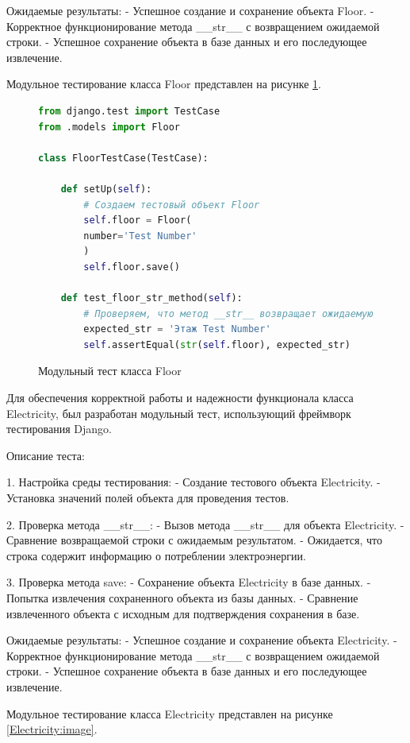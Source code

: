 Ожидаемые результаты:
- Успешное создание и сохранение объекта Floor.
- Корректное функционирование метода \_\_str\_\_ с возвращением ожидаемой строки.
- Успешное сохранение объекта в базе данных и его последующее извлечение.

Модульное тестирование класса Floor представлен на рисунке \ref{Floor:image}.


\begin{figure}[ht]
\begin{lstlisting}[language=Python]
from django.test import TestCase
from .models import Floor

class FloorTestCase(TestCase):

	def setUp(self):
		# Создаем тестовый объект Floor
		self.floor = Floor(
		number='Test Number'
		)
		self.floor.save()
	
	def test_floor_str_method(self):
		# Проверяем, что метод __str__ возвращает ожидаемую строку
		expected_str = 'Этаж Test Number'
		self.assertEqual(str(self.floor), expected_str)


\end{lstlisting}  
\caption{Модульный тест класса Floor}
\label{Floor:image}
\end{figure}

\newpage

Для обеспечения корректной работы и надежности функционала класса Electricity, был разработан модульный тест, использующий фреймворк тестирования Django.

Описание теста:

1. Настройка среды тестирования:
- Создание тестового объекта Electricity.
- Установка значений полей объекта для проведения тестов.

2. Проверка метода \_\_str\_\_:
- Вызов метода \_\_str\_\_ для объекта Electricity.
- Сравнение возвращаемой строки с ожидаемым результатом.
- Ожидается, что строка содержит информацию о потреблении электроэнергии.

3. Проверка метода save:
- Сохранение объекта Electricity в базе данных.
- Попытка извлечения сохраненного объекта из базы данных.
- Сравнение извлеченного объекта с исходным для подтверждения сохранения в базе.

Ожидаемые результаты:
- Успешное создание и сохранение объекта Electricity.
- Корректное функционирование метода \_\_str\_\_ с возвращением ожидаемой строки.
- Успешное сохранение объекта в базе данных и его последующее извлечение.

Модульное тестирование класса Electricity представлен на рисунке \ref{Electricity:image}.

